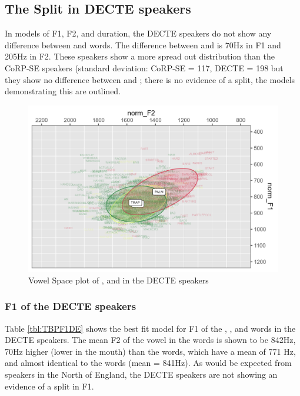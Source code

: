 \documentclass[../../../00.FullDoc/tex/APRReport-year4]{subfiles}
\begin{document}
\subsection{The Split in DECTE speakers}
In models of F1, F2, and duration, the DECTE speakers do not show any difference between \trap{} and \bath{} words. The difference between \trap{} and \palm{} is 70Hz in F1 and 205Hz in F2. These speakers show a more spread out \palm{} distribution than the CoRP-SE speakers (standard deviation: CoRP-SE = 117, DECTE = 198 but they show no difference between \trap {} and \bath{}; there is no evidence of a \TB{} split, the models demonstrating this are outlined.

\begin{figure}[h]
	\includegraphics[width=\textwidth]{../figures/TBP-DE-vplot.png}
	\caption{Vowel Space plot of \trap{},\bath{} and \palm{} in the DECTE speakers} \label{fig:TBPvplotDE}
\end{figure}



\subsubsection{F1 of the DECTE speakers}

Table \ref{tbl:TBPF1DE} shows the best fit model for F1 of the \trap{}, \bath{}, and \palm{} words in the DECTE speakers. The mean F2 of the vowel in the \bath{} words is shown to be 842Hz, 70Hz higher (lower in the mouth) than the \palm{} words, which have a mean of 771 Hz, and almost identical to the \trap{} words (mean = 841Hz). As would be expected from speakers in the North of England, the DECTE speakers are not showing an evidence of a \TB{} split in F1.
\end{document}
